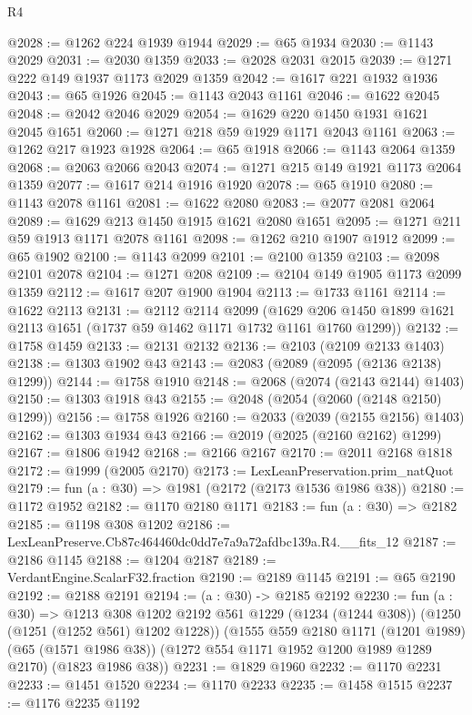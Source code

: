 \begin{lexlean}{R4}
\begin{coremodule}
@2028 := @1262 @224 @1939 @1944
@2029 := @65 @1934
@2030 := @1143 @2029
@2031 := @2030 @1359
@2033 := @2028 @2031 @2015
@2039 := @1271 @222 @149 @1937 @1173 @2029 @1359
@2042 := @1617 @221 @1932 @1936
@2043 := @65 @1926
@2045 := @1143 @2043 @1161
@2046 := @1622 @2045
@2048 := @2042 @2046 @2029
@2054 := @1629 @220 @1450 @1931 @1621 @2045 @1651
@2060 := @1271 @218 @59 @1929 @1171 @2043 @1161
@2063 := @1262 @217 @1923 @1928
@2064 := @65 @1918
@2066 := @1143 @2064 @1359
@2068 := @2063 @2066 @2043
@2074 := @1271 @215 @149 @1921 @1173 @2064 @1359
@2077 := @1617 @214 @1916 @1920
@2078 := @65 @1910
@2080 := @1143 @2078 @1161
@2081 := @1622 @2080
@2083 := @2077 @2081 @2064
@2089 := @1629 @213 @1450 @1915 @1621 @2080 @1651
@2095 := @1271 @211 @59 @1913 @1171 @2078 @1161
@2098 := @1262 @210 @1907 @1912
@2099 := @65 @1902
@2100 := @1143 @2099
@2101 := @2100 @1359
@2103 := @2098 @2101 @2078
@2104 := @1271 @208
@2109 := @2104 @149 @1905 @1173 @2099 @1359
@2112 := @1617 @207 @1900 @1904
@2113 := @1733 @1161
@2114 := @1622 @2113
@2131 := @2112
    @2114
    @2099
    (@1629 @206 @1450 @1899 @1621 @2113 @1651 (@1737 @59 @1462 @1171 @1732 @1161 @1760 @1299))
@2132 := @1758 @1459
@2133 := @2131 @2132
@2136 := @2103 (@2109 @2133 @1403)
@2138 := @1303 @1902 @43
@2143 := @2083 (@2089 (@2095 (@2136 @2138) @1299))
@2144 := @1758 @1910
@2148 := @2068 (@2074 (@2143 @2144) @1403)
@2150 := @1303 @1918 @43
@2155 := @2048 (@2054 (@2060 (@2148 @2150) @1299))
@2156 := @1758 @1926
@2160 := @2033 (@2039 (@2155 @2156) @1403)
@2162 := @1303 @1934 @43
@2166 := @2019 (@2025 (@2160 @2162) @1299)
@2167 := @1806 @1942
@2168 := @2166 @2167
@2170 := @2011 @2168 @1818
@2172 := @1999 (@2005 @2170)
@2173 := LexLeanPreservation.prim_natQuot
@2179 := fun (a : @30) => @1981 (@2172 (@2173 @1536 @1986 @38))
@2180 := @1172 @1952
@2182 := @1170 @2180 @1171
@2183 := fun (a : @30) => @2182
@2185 := @1198 @308 @1202
@2186 := LexLeanPreserve.Cb87c464460dc0dd7e7a9a72afdbc139a.R4.__fits_12
@2187 := @2186 @1145
@2188 := @1204 @2187
@2189 := VerdantEngine.ScalarF32.fraction
@2190 := @2189 @1145
@2191 := @65 @2190
@2192 := @2188 @2191
@2194 := (a : @30) -> @2185 @2192
@2230 := fun (a : @30) =>
  @1213
    @308
    @1202
    @2192
    @561
    @1229
    (@1234 (@1244 @308))
    (@1250 (@1251 (@1252 @561) @1202 @1228))
    (@1555
      @559
      @2180
      @1171
      (@1201 @1989)
      (@65 (@1571 @1986 @38))
      (@1272 @554 @1171 @1952 @1200 @1989 @1289 @2170)
      (@1823 @1986 @38))
@2231 := @1829 @1960
@2232 := @1170 @2231
@2233 := @1451 @1520
@2234 := @1170 @2233
@2235 := @1458 @1515
@2237 := @1176 @2235 @1192

\end{coremodule}
\end{lexlean}
